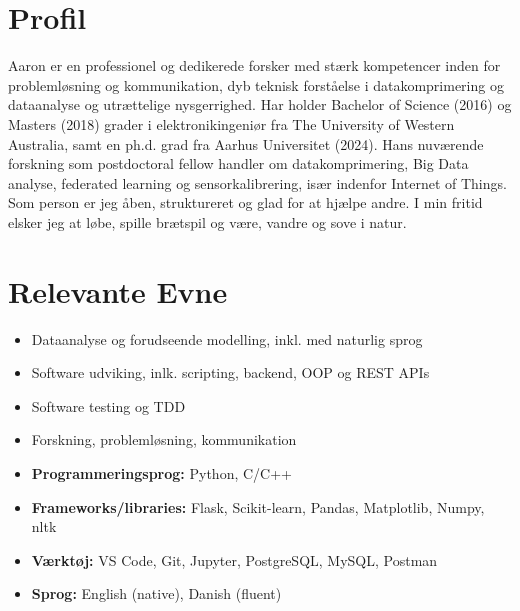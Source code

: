 \documentclass[a4paper,11pt]{article}
\begin{document}






\section{Profil}\vspace{-0.3em}

Aaron er en professionel og dedikerede forsker med stærk kompetencer inden for problemløsning og kommunikation, dyb teknisk forståelse i datakomprimering og dataanalyse og utrættelige nysgerrighed.
Har holder Bachelor of Science (2016) og Masters (2018) grader i elektronikingeniør fra The University of Western Australia, samt en ph.d. grad fra Aarhus Universitet (2024).
Hans nuværende forskning som postdoctoral fellow handler om datakomprimering, Big Data analyse, federated learning og sensorkalibrering, især indenfor Internet of Things.
Som person er jeg åben, struktureret og glad for at hjælpe andre.
I min fritid elsker jeg at løbe, spille brætspil og være, vandre og sove i natur.



\section{Relevante Evne}\vspace{-1.3em}

\begin{multicols}{2}
    \begin{itemize}[topsep=0pt,itemsep=-0.3em]
        \item Dataanalyse og forudseende modelling, inkl. med naturlig sprog
        \item Software udviking, inlk. scripting, backend, OOP og REST APIs
        \item Software testing og TDD
        \item Forskning, problemløsning, kommunikation

        \item \textbf{Programmeringsprog:} Python, C/C++
        \item \textbf{Frameworks/libraries:} Flask, Scikit-learn, Pandas, Matplotlib, Numpy, nltk
        \item \textbf{Værktøj:} VS Code, Git, Jupyter, PostgreSQL, MySQL, Postman
        \item \textbf{Sprog:} English (native), Danish (fluent)
    \end{itemize}
\end{multicols}
\vspace{-0.7em}
\end{document}
